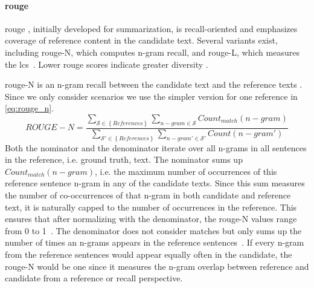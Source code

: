 \paragraph{\ac{rouge}}
\ac{rouge} \citep{lin_rouge_2004}, initially developed for summarization, is recall-oriented and emphasizes coverage of reference content in the candidate text. 
Several variants exist, including \ac{rouge}-N, which computes n-gram recall, and \ac{rouge}-L, which measures the \ac{lcs}~\citep{zhou_paraphrase_2021,palivela_optimization_2021,kurt_pehlivanoglu_comparative_2024}. 
Lower \ac{rouge} scores indicate greater diversity \citep{kurt_pehlivanoglu_comparative_2024}.

\ac{rouge}-N is an n-gram recall between the candidate text and the reference texts \citep{lin_rouge_2004}.
Since we only consider scenarios we use the simpler version for one reference in \autoref{eq:rouge_n}.
\begin{equation}
    ROUGE-N = \frac{\sum_{\mathcal{S} \in \left\{ References \right\}}\sum_{n-gram \in\mathcal{S}}Count_{match}(n-gram)}{\sum_{\mathcal{S'} \in \left\{ References \right\}}\sum_{n-gram' \in\mathcal{S'}}Count(n-gram')}
\label{eq:rouge_n}
\end{equation}
Both the nominator and the denominator iterate over all n-grams in all sentences in the reference, i.e. ground truth, text.
The nominator sums up $Count_{match}(n-gram)$, i.e. the maximum number of occurrences of this reference sentence n-gram in any of the candidate texts.
Since this sum measures the number of co-occurrences of that n-gram in both candidate and reference text, it is naturally capped to the number of occurrences in the reference.
This ensures that after normalizing with the denominator, the \ac{rouge}-N values range from 0 to 1~\citep{kurt_pehlivanoglu_comparative_2024}.
The denominator does not consider matches but only sums up the number of times an n-grams appears in the reference sentences~\citep{lin_rouge_2004}.
If every n-gram from the reference sentences would appear equally often in the candidate, the \ac{rouge}-N would be one since it measures the n-gram overlap between reference and candidate from a reference or recall perspective.


